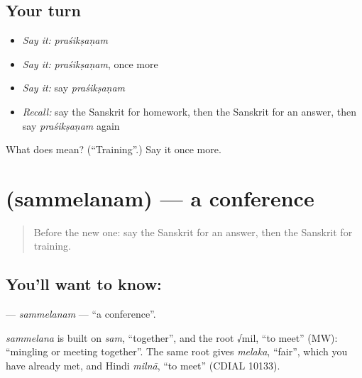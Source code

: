 \subsection*{Your turn}
\begin{itemize}
\raggedright
  \item \emph{Say it:} \emph{praśikṣaṇam}
  \item \emph{Say it:} \emph{praśikṣaṇam}, once more
  \item \emph{Say it:} say \emph{praśikṣaṇam}
  \item \emph{Recall:} say the Sanskrit for homework, then the Sanskrit for an answer, then say \emph{praśikṣaṇam} again
\end{itemize}

\begin{tcolorbox}[breakable,colback=teal!4,colframe=teal!35!black,title={Before you move on}]
What does  mean? (\textquotedblleft{}Training\textquotedblright{}.) Say it once more.
\end{tcolorbox}
\section[\texorpdfstring{\sk{सम्मेलनम्} (sammelanam)}{सम्मेलनम् (sammelanam)}]{ (sammelanam) — a conference}

\label{lesson:SA-C256-sammelanam}



\begin{quote}
Before the new one: say the Sanskrit for an answer, then the Sanskrit for training.
\end{quote}

\subsection*{You'll want to know: }
\textbf{} — \emph{sammelanam} — \textquotedblleft{}a conference\textquotedblright{}.

\begin{cousinweb}
\emph{sammelana} is built on \emph{sam}, \textquotedblleft{}together\textquotedblright{}, and the root √mil, \textquotedblleft{}to meet\textquotedblright{} (MW): \textquotedblleft{}mingling or meeting together\textquotedblright{}. The same root gives \emph{melaka}, \textquotedblleft{}fair\textquotedblright{}, which you have already met, and Hindi \emph{milnā}, \textquotedblleft{}to meet\textquotedblright{} (CDIAL 10133).
\end{cousinweb}

